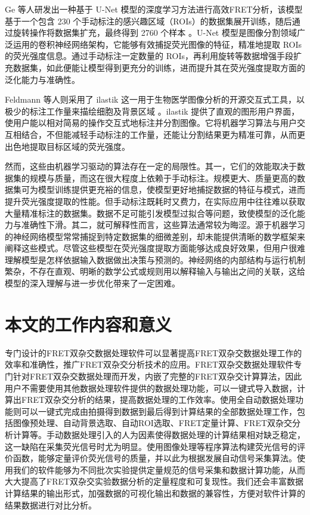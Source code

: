 Ge 等人研发出一种基于 U-Net  模型的深度学习方法进行高效FRET分析，该模型基于一个包含 230 个手动标注的感兴趣区域（ROIs）的数据集展开训练，随后通过旋转操作将数据集扩充，最终得到 2760 个样本 。U-Net 模型是图像分割领域广泛运用的卷积神经网络架构，它能够有效捕捉荧光图像的特征，精准地提取 ROIs 的荧光强度信息。通过手动标注一定数量的 ROIs，再利用旋转等数据增强手段扩充数据集，如此便能让模型得到更充分的训练，进而提升其在荧光强度提取方面的泛化能力与准确性。

Feldmann 等人则采用了 ilastik  这一用于生物医学图像分析的开源交互式工具，以极少的标注工作量来描绘细胞及背景区域 。ilastik 提供了直观的图形用户界面，使用户能以相对简易的操作交互式地标注并分割图像。它将机器学习算法与用户交互相结合，不但能减轻手动标注的工作量，还能让分割结果更为精准可靠，从而更出色地提取目标区域的荧光强度。

然而，这些由机器学习驱动的算法存在一定的局限性。其一，它们的效能取决于数据集的规模与质量，而这在很大程度上依赖于手动标注。规模更大、质量更高的数据集可为模型训练提供更充裕的信息，使模型更好地捕捉数据的特征与模式，进而提升荧光强度提取的性能。但手动标注既耗时又费力，在实际应用中往往难以获取大量精准标注的数据集。数据不足可能引发模型过拟合等问题，致使模型的泛化能力与准确性下滑。其二，就可解释性而言，这些算法通常较为晦涩。源于机器学习的神经网络模型常常捕捉到特定数据集的细微差别，却未能提供清晰的数学框架来阐释这些模式。尽管这些模型在荧光强度提取方面能够达成良好效果，但用户很难理解模型是怎样依据输入数据做出决策与预测的。神经网络的内部结构与运行机制繁杂，不存在直观、明晰的数学公式或规则用以解释输入与输出之间的关联，这给模型的深入理解与进一步优化带来了一定困难。
\fi

\section{本文的工作内容和意义}

\ifshowtext
专门设计的FRET双杂交数据处理软件可以显著提高FRET双杂交数据处理工作的效率和准确性，推广FRET双杂交分析技术的应用。FRET双杂交数据处理软件专门针对FRET双杂交数据处理而开发，内嵌了完整的FRET双杂交计算算法，因此用户不需要使用其他数据处理软件提供的数据处理功能，可以一键式导入数据，计算出FRET双杂交分析的结果，提高数据处理的工作效率。使用全自动数据处理功能则可以一键式完成由拍摄得到数据到最后得到计算结果的全部数据处理工作，包括图像预处理、自动背景选取、自动ROI选取、FRET定量计算、FRET双杂交分析计算等。手动数据处理引入的人为因素使得数据处理的计算结果相对缺乏稳定，这一缺陷在采集荧光信号时尤为明显。使用图像处理等程序算法构建荧光信号的评价函数，能够定量评价荧光信号的质量，并以此为根据发展自动信号采集算法。使用我们的软件能够为不同批次实验提供定量规范的信号采集和数据计算功能，从而大大提高了FRET双杂交实验数据分析的定量程度和可复现性。我们还会丰富数据计算结果的输出形式，加强数据的可视化输出和数据的兼容性，方便对软件计算的结果数据进行对比分析。

